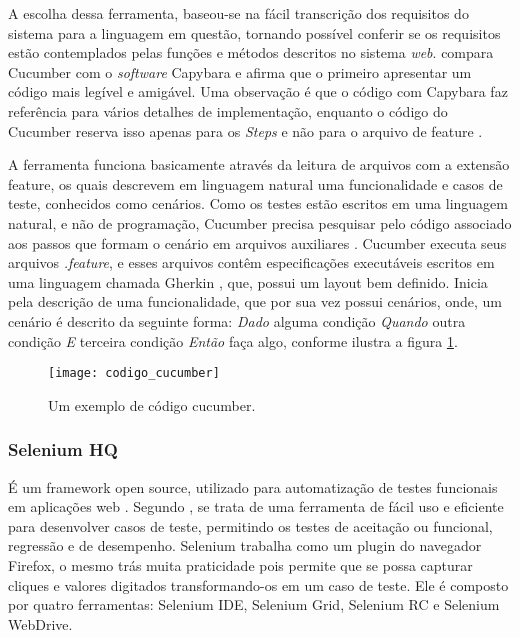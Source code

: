 \documentclass[12pt]{article}
\begin{document}
	A escolha dessa ferramenta, baseou-se na fácil transcrição dos requisitos do sistema para a linguagem em questão, tornando possível conferir se os requisitos estão contemplados pelas funções e métodos descritos no sistema \emph{web}. \citeauthor{lopescucumbervalor}\cite{lopescucumbervalor} compara Cucumber com o \emph{software} Capybara e afirma que o primeiro apresentar um código mais legível e amigável. Uma observação é que o código com Capybara faz referência para vários detalhes de implementação, enquanto o código do Cucumber reserva isso apenas para os \emph{Steps} e não para o arquivo de feature \cite{lopescucumbervalor}. 

	A ferramenta funciona basicamente através da leitura de arquivos com a extensão feature, os quais descrevem em linguagem natural uma funcionalidade e casos de teste, conhecidos como cenários.     
	Como os testes estão escritos em uma linguagem natural, e não de programação, Cucumber precisa pesquisar pelo código associado aos passos que formam o cenário em arquivos auxiliares \cite{scmitzcucumberreview}. Cucumber executa seus arquivos \emph{.feature}, e esses arquivos contêm especificações executáveis escritos em uma linguagem chamada Gherkin \cite{cucumberwiki}, que, possui um layout bem definido. Inicia pela descrição de uma funcionalidade, que por sua vez possui cenários, onde, um cenário é descrito da seguinte forma: \emph{Dado} alguma condição \emph{Quando} outra condição \emph{E} terceira condição \emph{Então} faça algo, conforme ilustra a figura \ref{fig:codigo_cucumber}.

	\begin{figure}[!htb]
		\centering
		\texttt{[image: codigo\_cucumber]}
		\caption{Um exemplo de código cucumber.}
		\label{fig:codigo_cucumber}
	\end{figure}

	\subsubsection{Selenium HQ}
	É um framework open source, utilizado para automatização de testes funcionais em aplicações web \cite{chiavegatto1desenvolvimento}. Segundo \citeauthor{pereiraestudoselenium} \cite{pereiraestudoselenium}, se trata de uma ferramenta de fácil uso e eficiente para desenvolver casos de teste, permitindo os testes de aceitação ou funcional, regressão e de desempenho. 
	Selenium trabalha como um plugin do navegador Firefox, o mesmo trás muita praticidade pois permite que se possa capturar cliques e valores digitados transformando-os em um caso de teste. Ele é composto por quatro ferramentas: Selenium IDE, Selenium Grid, Selenium RC e Selenium WebDrive. 
\end{document}

